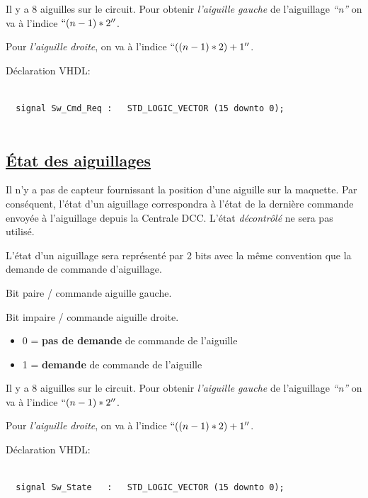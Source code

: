 \medskip


Il y a 8 aiguilles sur le circuit. Pour obtenir \emph{l'aiguille gauche} de
l'aiguillage \emph{``n''} on va à l'indice $``(n-1)*2''$.

Pour \emph{l'aiguille droite}, on va à l'indice $``((n-1)*2) + 1''$.

\bigskip


Déclaration VHDL:
\begin{lstlisting}[style=vhdl]
  
  signal Sw_Cmd_Req :   STD_LOGIC_VECTOR (15 downto 0);
  
\end{lstlisting}


\subsection{\underline{\'Etat des aiguillages}}
\label{sec:ixl_aig}

Il n'y a pas de capteur fournissant la position d'une aiguille sur la
maquette.  Par conséquent, l'état d'un aiguillage correspondra à l'état
de la dernière commande envoyée à l'aiguillage depuis la Centrale DCC.
L'état \emph{décontrôlé} ne sera pas utilisé.
 
L'état d'un aiguillage sera représenté par 2 bits avec la même
convention que la demande de commande d'aiguillage. 

Bit paire / commande aiguille gauche.

Bit impaire / commande aiguille droite.

\medskip

\begin{itemize}
\item 0 = \textbf{pas de demande} de commande de l'aiguille
\item 1 = \textbf{demande} de commande de l'aiguille
\end{itemize}

\medskip

Il y a 8 aiguilles sur le circuit. Pour obtenir \emph{l'aiguille gauche} de
l'aiguillage \emph{``n''} on va à l'indice $``(n-1)*2''$.

Pour \emph{l'aiguille droite}, on va à l'indice $``((n-1)*2) + 1''$.

\bigskip

Déclaration VHDL:
\begin{lstlisting}[style=vhdl]

  signal Sw_State   :   STD_LOGIC_VECTOR (15 downto 0);
  
\end{lstlisting}


